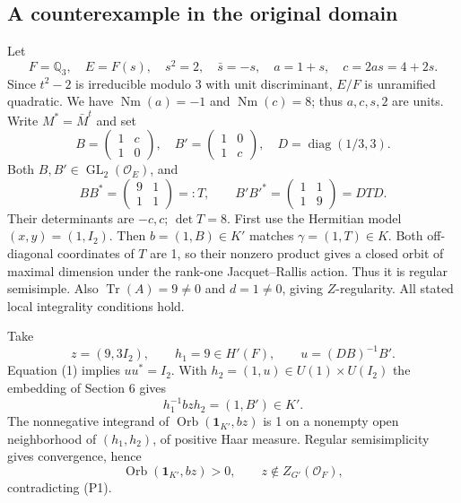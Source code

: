 \documentclass[10pt]{article}
\begin{document}
\subsection*{A counterexample in the original domain}
Let \[F=\mathbb Q_3,\quad E=F(s),\quad s^2=2,\quad \bar s=-s,\quad
 a=1+s,\quad c=2as=4+2s.\] Since \(t^2-2\) is irreducible modulo 3 with unit discriminant, \(E/F\) is unramified quadratic. We have \(\operatorname{Nm}(a)=-1\) and \(\operatorname{Nm}(c)=8\); thus \(a,c,s,2\) are units. Write \(M^*=\bar M^t\) and set \[B=\begin{pmatrix}1&c\\1&0\end{pmatrix},\quad
 B'=\begin{pmatrix}1&0\\1&c\end{pmatrix},\quad D=\operatorname{diag}(1/3,3).\] Both \(B,B'\in\operatorname{GL}_2(\mathcal O_E)\), and \[BB^*=\begin{pmatrix}9&1\\1&1\end{pmatrix}=:T,\qquad
 B'B'^*=\begin{pmatrix}1&1\\1&9\end{pmatrix}=DTD. \tag{1}\] Their determinants are \(-c,c\); \(\det T=8\). First use the Hermitian model \((x,y)=(1,I_2)\). Then \(b=(1,B)\in K'\) matches \(\gamma=(1,T)\in K\). Both off-diagonal coordinates of \(T\) are 1, so their nonzero product gives a closed orbit of maximal dimension under the rank-one Jacquet–Rallis action. Thus it is regular semisimple. Also \(\operatorname{Tr}(A)=9\ne0\) and \(d=1\ne0\), giving \(Z\)-regularity. All stated local integrality conditions hold.\par
Take \[z=(9,3I_2),\qquad h_1=9\in H'(F),\qquad u=(DB)^{-1}B'.\] Equation (1) implies \(uu^*=I_2\). With \(h_2=(1,u)\in U(1)\times U(I_2)\) the embedding of Section 6 gives \[h_1^{-1}bzh_2=(1,B')\in K'. \tag{2}\] The nonnegative integrand of \(\operatorname{Orb}(\mathbf 1_{K'},bz)\) is 1 on a nonempty open neighborhood of \((h_1,h_2)\), of positive Haar measure. Regular semisimplicity gives convergence, hence \[\operatorname{Orb}(\mathbf 1_{K'},bz)>0,\qquad z\notin Z_{G'}(\mathcal O_F), \tag{3}\] contradicting (P1).\par
\end{document}

